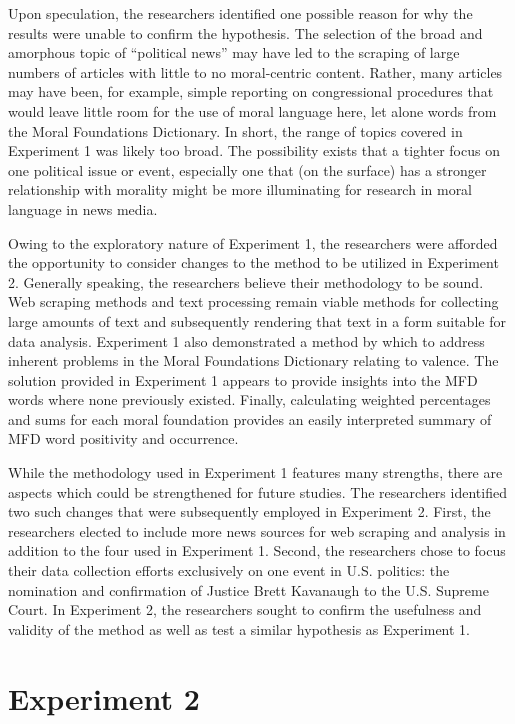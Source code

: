 \documentclass[english,,man]{apa6}
\begin{document}
Upon speculation, the researchers identified one possible reason for why the results were unable to confirm the hypothesis. The selection of the broad and amorphous topic of \enquote{political news} may have led to the scraping of large numbers of articles with little to no moral-centric content. Rather, many articles may have been, for example, simple reporting on congressional procedures that would leave little room for the use of moral language here, let alone words from the Moral Foundations Dictionary. In short, the range of topics covered in Experiment 1 was likely too broad. The possibility exists that a tighter focus on one political issue or event, especially one that (on the surface) has a stronger relationship with morality might be more illuminating for research in moral language in news media.

Owing to the exploratory nature of Experiment 1, the researchers were afforded the opportunity to consider changes to the method to be utilized in Experiment 2. Generally speaking, the researchers believe their methodology to be sound. Web scraping methods and text processing remain viable methods for collecting large amounts of text and subsequently rendering that text in a form suitable for data analysis. Experiment 1 also demonstrated a method by which to address inherent problems in the Moral Foundations Dictionary relating to valence. The solution provided in Experiment 1 appears to provide insights into the MFD words where none previously existed. Finally, calculating weighted percentages and sums for each moral foundation provides an easily interpreted summary of MFD word positivity and occurrence.

While the methodology used in Experiment 1 features many strengths, there are aspects which could be strengthened for future studies. The researchers identified two such changes that were subsequently employed in Experiment 2. First, the researchers elected to include more news sources for web scraping and analysis in addition to the four used in Experiment 1. Second, the researchers chose to focus their data collection efforts exclusively on one event in U.S. politics: the nomination and confirmation of Justice Brett Kavanaugh to the U.S. Supreme Court. In Experiment 2, the researchers sought to confirm the usefulness and validity of the method as well as test a similar hypothesis as Experiment 1.

\hypertarget{experiment-2}{%
\section{Experiment 2}\label{experiment-2}}
\end{document}
